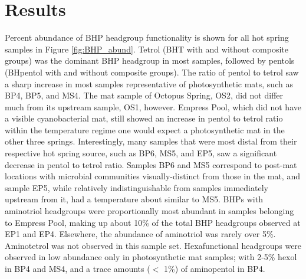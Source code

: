 \section{Results}

Percent abundance of BHP headgroup functionality is shown for all hot spring samples in Figure \ref{fig:BHP_abund}. Tetrol (BHT with and without composite groups) was the dominant BHP headgroup in most samples, followed by pentols (BHpentol with and without composite groups). The ratio of pentol to tetrol saw a sharp increase in most samples representative of photosynthetic mats, such as BP4, BP5, and MS4. The mat sample of Octopus Spring, OS2, did not differ much from its upstream sample, OS1, however. Empress Pool, which did not have a visible cyanobacterial mat, still showed an increase in pentol to tetrol ratio within the temperature regime one would expect a photosynthetic mat in the other three springs. Interestingly, many samples that were most distal from their respective hot spring source, such as BP6, MS5, and EP5, saw a significant decrease in pentol to tetrol ratio. Samples BP6 and MS5 correspond to post-mat locations with microbial communities visually-distinct from those in the mat, and sample EP5, while relatively indistinguishable from samples immediately upstream from it, had a temperature about similar to MS5. BHPs with aminotriol headgroups were proportionally most abundant in samples belonging to Empress Pool, making up about 10\% of the total BHP headgroups observed at EP1 and EP4. Elsewhere, the abundance of aminotriol was rarely over 5\%. Aminotetrol was not observed in this sample set. Hexafunctional headgroups were observed in low abundance only in photosynthetic mat samples; with 2-5\% hexol in BP4 and MS4, and a trace amounts ($<$ 1\%) of aminopentol in BP4.


